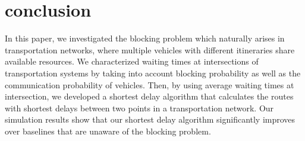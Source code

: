 \documentclass[conference]{IEEEtran}
\begin{document}
\vspace{-5pt}
\section{conclusion}\label{sec:conclusion}
In this paper, we investigated the blocking problem which naturally arises in transportation networks, where multiple vehicles with different itineraries share available resources. We characterized waiting times at intersections of transportation systems by taking into account blocking probability as well as the communication probability of vehicles. Then, by using average waiting times at intersection, we developed a shortest delay algorithm that calculates the routes with shortest delays between two points in a transportation network. Our simulation results show that our shortest delay algorithm significantly improves over baselines that are unaware of the blocking problem.
\end{document}
